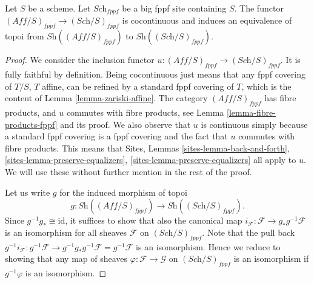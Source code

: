 \begin{lemma}
\label{lemma-affine-big-site-fppf}
Let $S$ be a scheme. Let $\textit{Sch}_{fppf}$ be a big fppf
site containing $S$.
The functor $(\textit{Aff}/S)_{fppf} \to (\textit{Sch}/S)_{fppf}$
is cocontinuous and induces an equivalence of topoi from
$\textit{Sh}((\textit{Aff}/S)_{fppf})$ to
$\textit{Sh}((\textit{Sch}/S)_{fppf})$.
\end{lemma}

\begin{proof}
We consider the inclusion functor
$u : (\textit{Aff}/S)_{fppf} \to (\textit{Sch}/S)_{fppf}$.
It is fully faithful by definition. Being cocontinuous
just means that any fppf covering of $T/S$, $T$ affine,
can be refined by a standard fppf covering of $T$, which
is the content of Lemma \ref{lemma-zariski-affine}.
The category $(\textit{Aff}/S)_{fppf}$ has fibre products, and $u$ commutes
with fibre products, see Lemma \ref{lemma-fibre-products-fppf}
and its proof.
We also observe that $u$ is continuous
simply because a standard fppf covering is a fppf covering
and the fact that $u$ commutes with fibre products.
This means that
Sites, Lemmas \ref{sites-lemma-back-and-forth},
\ref{sites-lemma-preserve-equalizers},
\ref{sites-lemma-preserve-equalizers} all apply to $u$.
We will use these without further mention in the rest of the proof.

\medskip\noindent
Let us write $g$ for the induced morphism of topoi
$$
g : \textit{Sh}((\textit{Aff}/S)_{fppf}) \longrightarrow
\textit{Sh}((\textit{Sch}/S)_{fppf}).
$$
Since $g^{-1}g_* \cong \text{id}$, it suffices to show that
also the canonical map
$i_{\mathcal{F}} : \mathcal{F} \to g_* g^{-1} \mathcal{F}$
is an isomorphism for all sheaves $\mathcal{F}$ on
$(\textit{Sch}/S)_{fppf}$. Note that the pull back
$g^{-1}i_{\mathcal{F}} : g^{-1} \mathcal{F} \to
g^{-1} g_* g^{-1} \mathcal{F} = g^{-1} \mathcal{F}$
is an isomorphism. Hence we reduce to showing that any
map of sheaves $\varphi : \mathcal{F} \to \mathcal{G}$ on
$(\textit{Sch}/S)_{fppf}$ is an isomorphism if $g^{-1}\varphi$
is an isomorphism.


\end{proof}
